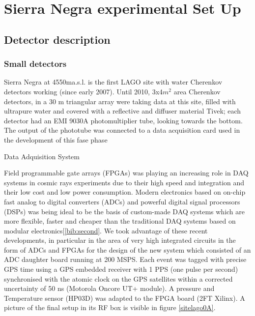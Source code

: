 \documentclass[a4paper]{article}
\title{}
\author{}
\begin{document}
\maketitle

\begin{abstract}

\end{abstract}

\section{Sierra Negra experimental Set Up}
\subsection{Detector description}
\subsubsection{Small detectors}
Sierra Negra at 4550ma.s.l. is the first LAGO site with water Cherenkov detectors working (since early 2007). 
Until 2010, 3x4$m^{2}$ area Cherenkov detectors, in a 30 m triangular array were taking data at this site, 
filled with ultrapure water and covered with a reflective and diffuser material Tivek; each detector had an 
EMI 9030A photomultiplier tube, looking towards the bottom. The output of the phototube was connected to a 
data acquisition card used in the development of this fase phase 


Data Adquisition System

Field programmable gate arrays (FPGAs) was playing an increasing role in DAQ systems in cosmic rays experiments due 
to their high speed and integration and their low cost and low power consumption. Modern
electronics based on on-chip fast analog to digital converters (ADCs) and powerful digital signal processors
(DSPs) was being  ideal to be the basis of custom-made DAQ systems which are more flexible, faster and 
cheaper than the traditional DAQ systems based on modular electronics[\ref{bib:second}. We took advantage of these
recent developments, in particular in the area of very high integrated circuits in the form of ADCs and FPGAs
for the design of the new system which consisted of an ADC daughter board running at 200 MSPS. Each event
was tagged with precise GPS time using a GPS embedded receiver with 1 PPS (one pulse per second) synchronised
with the atomic clock on the GPS satellites within a corrected uncertainty of 50 ns (Motorola Oncore UT+
module). A pressure and Temperature sensor (HP03D) was adapted to the FPGA board (2FT Xilinx). A picture
of the final setup in its RF box is visible in figure \ref{sitelago0A}.
\end{document}
